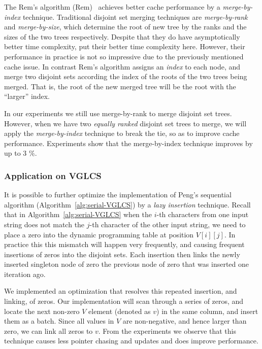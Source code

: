 
The Rem's algorithm ({\sc Rem})~\cite{dijkstra1976a} achieves better
cache performance by a {\em merge-by-index} technique.  Traditional
disjoint set merging techniques are {\em merge-by-rank}\cite{XXX} and
{\em merge-by-size}\cite{XXX}, which determine the root of new tree by
the ranks and the sizes of the two trees respectively.  Despite that
they do have asymptotically better time complexity, put their better
time complexity here.  However, their performance in practice is not
so impressive due to the previously mentioned cache issue.  In
contrast Rem's algorithm assigns an {\em index} to each node, and
merge two disjoint sets according the index of the roots of the two
trees being merged.  That is, the root of the new merged tree will be
the root with the ``larger'' index.

In our experiments we still use merge-by-rank to merge disjoint set
trees.  However, when we have two {\em equally ranked} disjoint set
trees to merge, we will apply the {\em merge-by-index} technique to
break the tie, so as to improve cache performance.  Experiments show
that the merge-by-index technique improves by up to 3 \%.

\subsubsection{Application on VGLCS}


It is possible to further optimize the implementation of Peng's
sequential algorithm (Algorithm~\ref{alg:serial-VGLCS}) by a {\em lazy
  insertion} technique.  Recall that in
Algorithm~\ref{alg:serial-VGLCS} when the $i$-th characters from one
input string does not match the $j$-th character of the other input
string, we need to place a zero into the dynamic programming table at
position $V[i][j]$.  In practice this this mismatch will happen very
frequently, and causing frequent insertions of zeros into the disjoint
sets.  Each insertion then links the newly inserted singleton node of
zero the previous node of zero that was inserted one iteration ago. 

We implemented an optimization that resolves this repeated insertion,
and linking, of zeros.  Our implementation will scan through a series
of zeros, and locate the next non-zero $V$ element (denoted as $v$) in
the same column, and insert them as a batch.  Since all values in $V$
are non-negative, and hence larger than zero, we can link all zeros to
$v$.  From the experiments we observe that this technique causes less
pointer chasing and updates and does improve performance.

